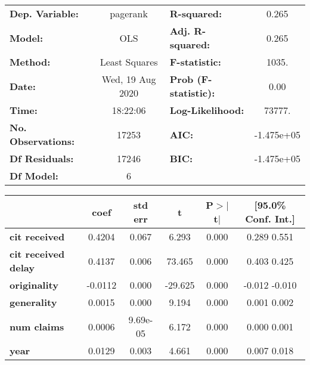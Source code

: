 \begin{center}
\begin{tabular}{lclc}
\toprule
\textbf{Dep. Variable:}     &     pagerank     & \textbf{  R-squared:         } &      0.265    \\
\textbf{Model:}             &       OLS        & \textbf{  Adj. R-squared:    } &      0.265    \\
\textbf{Method:}            &  Least Squares   & \textbf{  F-statistic:       } &      1035.    \\
\textbf{Date:}              & Wed, 19 Aug 2020 & \textbf{  Prob (F-statistic):} &      0.00     \\
\textbf{Time:}              &     18:22:06     & \textbf{  Log-Likelihood:    } &     73777.    \\
\textbf{No. Observations:}  &       17253      & \textbf{  AIC:               } &  -1.475e+05   \\
\textbf{Df Residuals:}      &       17246      & \textbf{  BIC:               } &  -1.475e+05   \\
\textbf{Df Model:}          &           6      & \textbf{                     } &               \\
\bottomrule
\end{tabular}
\begin{tabular}{lccccc}
                            & \textbf{coef} & \textbf{std err} & \textbf{t} & \textbf{P$>$$|$t$|$} & \textbf{[95.0\% Conf. Int.]}  \\
\midrule
\textbf{cit received}       &       0.4204  &        0.067     &     6.293  &         0.000        &         0.289     0.551       \\
\textbf{cit received delay} &       0.4137  &        0.006     &    73.465  &         0.000        &         0.403     0.425       \\
\textbf{originality}        &      -0.0112  &        0.000     &   -29.625  &         0.000        &        -0.012    -0.010       \\
\textbf{generality}         &       0.0015  &        0.000     &     9.194  &         0.000        &         0.001     0.002       \\
\textbf{num claims}         &       0.0006  &     9.69e-05     &     6.172  &         0.000        &         0.000     0.001       \\
\textbf{year}               &       0.0129  &        0.003     &     4.661  &         0.000        &         0.007     0.018       \\
\bottomrule

\end{tabular}
\end{center}
